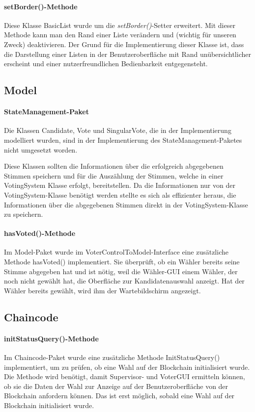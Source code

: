 \documentclass[parskip=full]{scrartcl}
\begin{document}
\paragraph{setBorder()-Methode}
Diese Klasse BasicList wurde um die \textit{setBorder()}-Setter erweitert. Mit dieser Methode kann man den Rand einer Liste verändern und (wichtig für unseren Zweck) deaktivieren. Der Grund für die Implementierung dieser Klasse ist, dass die Darstellung einer Listen in der Benutzeroberfläche mit Rand unübersichtlicher erscheint und einer nutzerfreundlichen Bedienbarkeit entgegensteht.

\subsection{Model}
\paragraph{StateManagement-Paket}
Die Klassen Candidate, Vote und SingularVote, die in der Implementierung modelliert wurden, sind in der Implementierung des StateManagement-Paketes nicht umgesetzt worden.

Diese Klassen sollten die Informationen über die erfolgreich abgegebenen Stimmen speichern und für die Auszählung der Stimmen, welche in einer VotingSystem Klasse erfolgt, bereitstellen.
Da die Informationen nur von der VotingSystem-Klasse benötigt werden
stellte es sich als effizienter heraus, die Informationen über die abgegebenen Stimmen direkt in der VotingSystem-Klasse zu speichern.

\paragraph{hasVoted()-Methode}
Im Model-Paket wurde im VoterControlToModel-Interface eine zusätzliche Methode hasVoted() implementiert. Sie überprüft, ob ein Wähler bereits seine Stimme abgegeben hat und ist nötig, weil die Wähler-GUI einem Wähler, der noch nicht gewählt hat, die Oberfläche zur Kandidatenauswahl anzeigt. Hat der Wähler bereits gewählt, wird ihm der Wartebildschirm angezeigt.

\subsection{Chaincode}
\paragraph{initStatusQuery()-Methode}
Im Chaincode-Paket wurde eine zusätzliche Methode InitStatusQuery() implementiert, um zu prüfen, ob eine Wahl auf der Blockchain initialisiert wurde. Die Methode wird benötigt, damit Supervisor- und VoterGUI ermitteln können, ob sie die Daten der Wahl zur Anzeige auf der Benutzeroberfläche von der Blockchain anfordern können. Das ist erst möglich, sobald eine Wahl auf der Blockchain initialisiert wurde.
\end{document}
